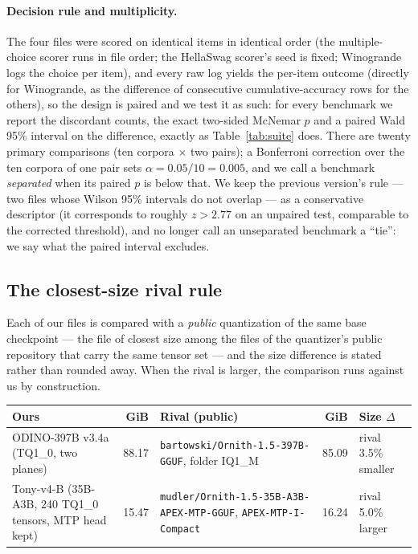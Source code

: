 \documentclass[10pt]{article} %
\begin{document}
\paragraph{Decision rule and multiplicity.} The four files were scored on
identical items in identical order (the multiple-choice scorer runs in file
order; the HellaSwag scorer's seed is fixed; Winogrande logs the choice per
item), and every raw log yields the per-item outcome (directly for
Winogrande, as the difference of consecutive cumulative-accuracy rows for the
others), so the design is paired and we test it as such: for every benchmark
we report the discordant counts, the exact two-sided McNemar $p$ and a paired
Wald 95\% interval on the difference, exactly as Table~\ref{tab:suite} does.
There are twenty primary comparisons (ten corpora $\times$ two pairs); a
Bonferroni correction over the ten corpora of one pair sets
$\alpha = 0.05/10 = 0.005$, and we call a benchmark \emph{separated} when its
paired $p$ is below that. We keep the previous version's rule --- two files
whose Wilson 95\% intervals do not overlap --- as a conservative descriptor
(it corresponds to roughly $z > 2.77$ on an unpaired test, comparable to the
corrected threshold), and no longer call an unseparated benchmark a ``tie'':
we say what the paired interval excludes.

\subsection{The closest-size rival rule}
\label{sec:rival}

Each of our files is compared with a \emph{public} quantization of the same
base checkpoint --- the file of closest size among the files of the
quantizer's public repository that carry the same tensor set
\citep{bartowski2026ornith397,mudler2026ornith35} --- and the size difference
is stated rather than rounded away.
When the rival is larger, the comparison runs against us by construction.

\begin{center}
\small
\begin{tabular}{@{}>{\raggedright\arraybackslash}p{3.6cm} r >{\raggedright\arraybackslash}p{5.2cm} r >{\raggedright\arraybackslash}p{1.9cm}@{}}
\toprule
Ours & GiB & Rival (public) & GiB & Size $\Delta$ \\
\midrule
ODINO-397B v3.4a (TQ1\_0, two planes) & 88.17 & \texttt{bartowski/Ornith-1.5-397B-GGUF}, folder IQ1\_M & 85.09 & rival 3.5\% smaller \\
Tony-v4-B (35B-A3B, 240 TQ1\_0 tensors, MTP head kept) & 15.47 & \texttt{mudler/Ornith-1.5-35B-A3B-} \texttt{APEX-MTP-GGUF}, \texttt{APEX-MTP-I-Compact} & 16.24 & rival 5.0\% larger \\
\bottomrule
\end{tabular}
\end{center}
\end{document}
